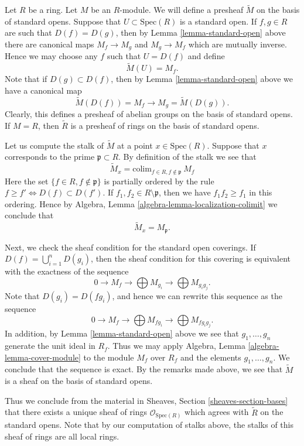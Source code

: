 \noindent
Let $R$ be a ring. Let $M$ be an $R$-module. We will define
a presheaf $\widetilde M$ on the basis of standard opens.
Suppose that $U \subset \text{Spec}(R)$ is a standard open.
If $f, g \in R$ are such that $D(f) = D(g)$, then
by Lemma \ref{lemma-standard-open} above there are canonical
maps $M_f \to M_g$ and $M_g \to M_f$ which are mutually inverse.
Hence we may choose any $f$ such that $U = D(f)$
and define
$$
\widetilde M(U) = M_f.
$$
Note that if $D(g) \subset D(f)$, then by
Lemma \ref{lemma-standard-open} above we have
a canonical map
$$
\widetilde M(D(f)) = M_f \longrightarrow M_g = \widetilde M(D(g)).
$$
Clearly, this defines a presheaf of abelian groups on the basis
of standard opens. If $M = R$, then $\widetilde R$ is a presheaf
of rings on the basis of standard opens.

\medskip\noindent
Let us compute the stalk of $\widetilde M$ at a point $x \in \text{Spec}(R)$.
Suppose that $x$ corresponds to the prime $\mathfrak p \subset R$.
By definition of the stalk we see that
$$
\widetilde M_x = \text{colim}_{f\in R, f\not\in \mathfrak p}\ M_f
$$
Here the set $\{f\in R, f\not\in \mathfrak p\}$ is partially
ordered by the rule $f \geq f' \Leftrightarrow D(f) \subset D(f')$.
If $f_1, f_2 \in R \setminus \mathfrak p$, then we have
$f_1f_2 \geq f_1$ in this ordering. Hence by
Algebra, Lemma \ref{algebra-lemma-localization-colimit}
we conclude that
$$
\widetilde M_x = M_{\mathfrak p}.
$$

\medskip\noindent
Next, we check the sheaf condition for the standard open coverings.
If $D(f) = \bigcup_{i = 1}^n D(g_i)$, then the sheaf condition
for this covering is equivalent with the exactness of the
sequence
$$
0 \to M_f \to \bigoplus M_{g_i} \to \bigoplus M_{g_ig_j}.
$$
Note that $D(g_i) = D(fg_i)$, and hence we can rewrite this
sequence as the sequence
$$
0 \to M_f \to \bigoplus M_{fg_i} \to \bigoplus M_{fg_ig_j}.
$$
In addition, by Lemma \ref{lemma-standard-open} above
we see that $g_1, \ldots, g_n$ generate the unit ideal
in $R_f$. Thus we may apply
Algebra, Lemma \ref{algebra-lemma-cover-module}
to the module $M_f$ over $R_f$ and the elements $g_1, \ldots, g_n$.
We conclude that the sequence is exact. By the remarks
made above, we see that $\widetilde M$ is a sheaf
on the basis of standard opens.

\medskip\noindent
Thus we conclude from the material in
Sheaves, Section \ref{sheaves-section-bases}
that there exists a
unique sheaf of rings $\mathcal{O}_{\text{Spec}(R)}$
which agrees with $\widetilde R$ on the standard opens.
Note that by our computation of stalks above, the
stalks of this sheaf of rings are all local rings.

